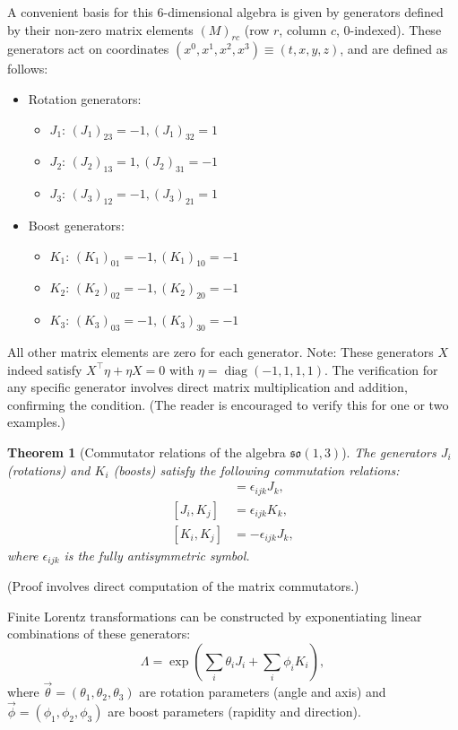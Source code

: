 \documentclass{amsart}
\newtheorem{theorem}{Theorem}[section]
\theoremstyle{definition}
\theoremstyle{remark}
\DeclareMathOperator{\diag}{diag}
\begin{document}
A convenient basis for this 6-dimensional algebra is given by generators defined by their non-zero matrix elements $(M)_{rc}$ (row $r$, column $c$, 0-indexed). These generators act on coordinates $(x^0, x^1, x^2, x^3) \equiv (t,x,y,z)$, and are defined as follows:
\begin{itemize}
    \item Rotation generators:
    \begin{itemize}
        \item $J_1$: $(J_1)_{23} = -1, (J_1)_{32} = 1$
        \item $J_2$: $(J_2)_{13} = 1, (J_2)_{31} = -1$
        \item $J_3$: $(J_3)_{12} = -1, (J_3)_{21} = 1$
    \end{itemize}
    \item Boost generators:
    \begin{itemize}
        \item $K_1$: $(K_1)_{01} = -1, (K_1)_{10} = -1$
        \item $K_2$: $(K_2)_{02} = -1, (K_2)_{20} = -1$
        \item $K_3$: $(K_3)_{03} = -1, (K_3)_{30} = -1$
    \end{itemize}
\end{itemize}
All other matrix elements are zero for each generator.
Note: These generators $X$ indeed satisfy $X^\top \eta + \eta X = 0$ with $\eta=\diag(-1,1,1,1)$. The verification for any specific generator involves direct matrix multiplication and addition, confirming the condition. (The reader is encouraged to verify this for one or two examples.)

\begin{theorem}[Commutator relations of the algebra $\mathfrak{so}(1,3)$]\label{thm:so13_algebra_commutation_relations}
  The generators $J_i$ (rotations) and $K_i$ (boosts) satisfy the following commutation relations:
  \begin{align*}
    [J_i, J_j] &= \epsilon_{ijk} J_k, \\
    [J_i, K_j] &= \epsilon_{ijk} K_k, \\
    [K_i, K_j] &= -\epsilon_{ijk} J_k,
  \end{align*}
  where $\epsilon_{ijk}$ is the fully antisymmetric symbol.
\end{theorem}
(Proof involves direct computation of the matrix commutators.)

Finite Lorentz transformations can be constructed by exponentiating linear combinations of these generators:
\begin{equation*}
  \Lambda = \exp\left(\sum_i \theta_i J_i + \sum_i \phi_i K_i \right),
\end{equation*}
where $\vec{\theta} = (\theta_1, \theta_2, \theta_3)$ are rotation parameters (angle and axis) and $\vec{\phi} = (\phi_1, \phi_2, \phi_3)$ are boost parameters (rapidity and direction).
\end{document}
